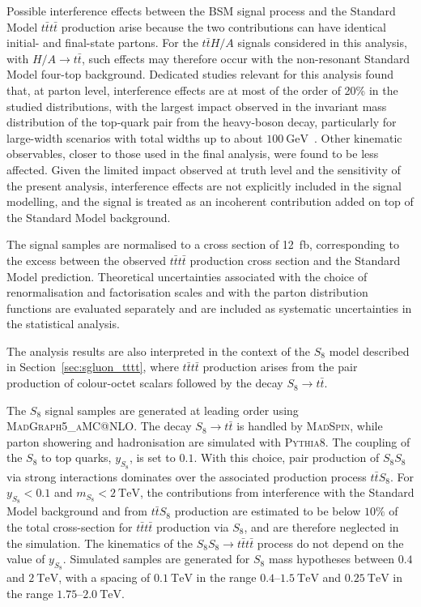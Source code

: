 \begin{description}
Possible interference effects between the BSM signal process and the
Standard Model $t\bar{t}t\bar{t}$ production arise because the two
contributions can have identical initial- and final-state partons.
For the $t\bar{t}H/A$ signals considered in this analysis, with
$H/A\to t\bar{t}$, such effects may therefore occur with the non-resonant
Standard Model four-top background. Dedicated studies relevant for this
analysis found that, at parton level, interference effects are at most of
the order of 20\% in the studied distributions, with the largest impact
observed in the invariant mass distribution of the top-quark pair from
the heavy-boson decay, particularly for large-width scenarios with total
widths up to about $100~\mathrm{GeV}$~\cite{Orlando:2258130}. Other
kinematic observables, closer to those used in the final analysis, were
found to be less affected. Given the limited impact observed at truth
level and the sensitivity of the present analysis, interference effects
are not explicitly included in the signal modelling, and the signal is
treated as an incoherent contribution added on top of the Standard Model
background.

The signal samples are normalised to a cross section of 12~fb, corresponding to 
the excess between the observed $t\bar{t}t\bar{t}$ production cross section and the Standard Model prediction.
Theoretical uncertainties associated with the choice of renormalisation and
factorisation scales and with the parton distribution functions are evaluated
separately and are included as systematic uncertainties in the statistical analysis.

\item[$S_{8}$ pair production:]
\label{subsubsec:sgluon_signal}

The analysis results are also interpreted in the context of the
$S_{8}$ model described in
Section~\ref{sec:sgluon_tttt},
where $t\bar{t}t\bar{t}$ production arises from the pair production of
colour-octet scalars followed by the decay
\(S_8 \rightarrow t\bar{t}\).

The $S_{8}$ signal samples are generated at leading order using
\textsc{MadGraph5\_aMC@NLO}.
The decay $S_8 \rightarrow t\bar{t}$ is handled by \textsc{MadSpin},
while parton showering and hadronisation are simulated with
\textsc{Pythia8}.
The coupling of the $S_{8}$ to top quarks, $y_{S_8}$, is set to $0.1$.
With this choice, pair production of $S_{8}S_{8}$ via strong interactions
dominates over the associated production process $t\bar{t}S_{8}$.
For $y_{S_8}<0.1$ and $m_{S_8}<2~\mathrm{TeV}$, the contributions from
interference with the Standard Model background and from $t\bar{t}S_{8}$
production are estimated to be below $10\%$ of the total cross-section
for $t\bar{t}t\bar{t}$ production via $S_{8}$, and are therefore neglected
in the simulation.
The kinematics of the $S_{8}S_{8} \rightarrow t\bar{t}t\bar{t}$ process do
not depend on the value of $y_{S_8}$.
Simulated samples are generated for $S_{8}$ mass hypotheses between
$0.4$ and $2~\mathrm{TeV}$, with a spacing of $0.1~\mathrm{TeV}$ in the
range $0.4$--$1.5~\mathrm{TeV}$ and $0.25~\mathrm{TeV}$ in the range
$1.75$--$2.0~\mathrm{TeV}$.


\end{description}
